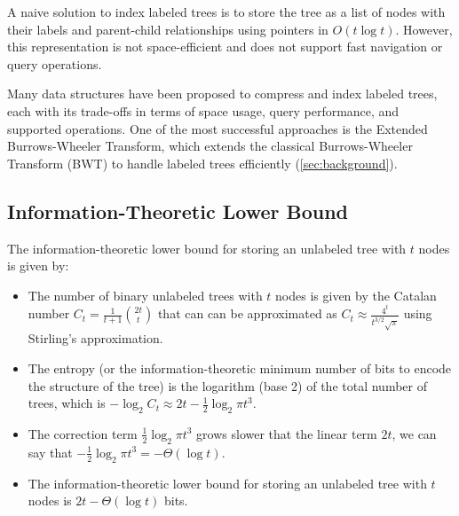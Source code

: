 A naive solution to index labeled trees is to store the tree as a list of nodes with their labels and parent-child relationships using pointers in $O(t \log t)$. However, this representation is not space-efficient and does not support fast navigation or query operations. 

Many data structures have been proposed to compress and index labeled trees, each with its trade-offs in terms of space usage, query performance, and supported operations. One of the most successful approaches is the Extended Burrows-Wheeler Transform, which extends the classical Burrows-Wheeler Transform (BWT) to handle labeled trees efficiently (\cref{sec:background}).

\begin{comment}
    \section{Succinct Data Structures for Trees}
    \alessio{Questa sezione non è ben collegata al resto. Serve questa parentesi sulle SDS? Dato che anche prima parli di minimizzare lo spazio e time optimality, potresti parlare direttamente dei lower bound. Il filo logico sarebbe: "vogliamo fare le cose il meglio possibile, ma quanto vale il meglio?"}
    In order to compress the index of labeled trees, we need to avoid the use of pointers and store the tree in a space-efficient manner. Succinct data structures are a class of compressed data structures that support efficient navigation and query operations on the compressed data. These structures are designed to use close to the information-theoretic lower bound on space while providing fast access to the original data. They were first introduced by Jacobson \cite{jacobson1989space} and have been applied to various problems in string processing, graph theory, and data compression.
\end{comment}

\subsection{Information-Theoretic Lower Bound}
The information-theoretic lower bound for storing an unlabeled tree with $t$ nodes is given by:

\begin{itemize}
    \item The number of binary unlabeled trees with $t$ nodes is given by the Catalan number $C_t = \frac{1}{t+1} \binom{2t}{t}$ that can can be approximated as $C_t \approx \frac{4^t}{t^{3/2}\sqrt{\pi}}$ using Stirling's approximation.
    \item The entropy (or the information-theoretic minimum number of bits to encode the structure of the tree) is the logarithm (base 2) of the total number of trees, which is $-\log_2 C_t \approx 2t - \frac{1}{2} \log_2 \pi t^3$.
    \item The correction term $\frac{1}{2} \log_2 \pi t^3$ grows slower that the linear term $2t$, we can say that $-\frac{1}{2} \log_2 \pi t^3 = -\Theta(\log t)$.
    \item The information-theoretic lower bound for storing an unlabeled tree with $t$ nodes is $2t - \Theta(\log t)$ bits.
\end{itemize}

